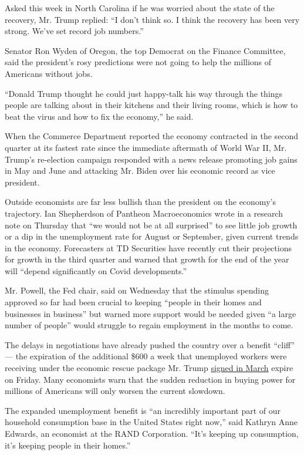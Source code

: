 Asked this week in North Carolina if he was worried about the state of
the recovery, Mr. Trump replied: ``I don't think so. I think the
recovery has been very strong. We've set record job numbers.''

Senator Ron Wyden of Oregon, the top Democrat on the Finance Committee,
said the president's rosy predictions were not going to help the
millions of Americans without jobs.

``Donald Trump thought he could just happy-talk his way through the
things people are talking about in their kitchens and their living
rooms, which is how to beat the virus and how to fix the economy,'' he
said.

When the Commerce Department reported the economy contracted in the
second quarter at its fastest rate since the immediate aftermath of
World War II, Mr. Trump's re-election campaign responded with a news
release promoting job gains in May and June and attacking Mr. Biden over
his economic record as vice president.

Outside economists are far less bullish than the president on the
economy's trajectory. Ian Shepherdson of Pantheon Macroeconomics wrote
in a research note on Thursday that ``we would not be at all surprised''
to see little job growth or a dip in the unemployment rate for August or
September, given current trends in the economy. Forecasters at TD
Securities have recently cut their projections for growth in the third
quarter and warned that growth for the end of the year will ``depend
significantly on Covid developments.''

Mr. Powell, the Fed chair, said on Wednesday that the stimulus spending
approved so far had been crucial to keeping ``people in their homes and
businesses in business'' but warned more support would be needed given
``a large number of people'' would struggle to regain employment in the
months to come.

The delays in negotiations have already pushed the country over a
benefit ``cliff'' --- the expiration of the additional \$600 a week that
unemployed workers were receiving under the economic rescue package Mr.
Trump
\href{https://www.nytimes3xbfgragh.onion/2020/03/25/us/politics/coronavirus-senate-deal.html}{signed
in March} expire on Friday. Many economists warn that the sudden
reduction in buying power for millions of Americans will only worsen the
current slowdown.

The expanded unemployment benefit is ``an incredibly important part of
our household consumption base in the United States right now,'' said
Kathryn Anne Edwards, an economist at the RAND Corporation. ``It's
keeping up consumption, it's keeping people in their homes.''

